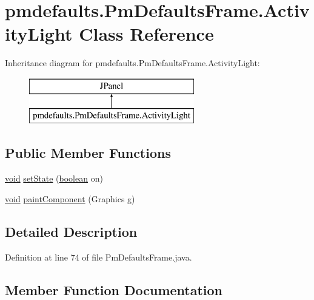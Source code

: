 \hypertarget{classpmdefaults_1_1_pm_defaults_frame_1_1_activity_light}{}\section{pmdefaults.\+Pm\+Defaults\+Frame.\+Activity\+Light Class Reference}
\label{classpmdefaults_1_1_pm_defaults_frame_1_1_activity_light}
Inheritance diagram for pmdefaults.\+Pm\+Defaults\+Frame.\+Activity\+Light\+:\begin{figure}[H]
\begin{center}
\leavevmode
\includegraphics[height=2.000000cm]{classpmdefaults_1_1_pm_defaults_frame_1_1_activity_light}
\end{center}
\end{figure}
\subsection*{Public Member Functions}
\begin{DoxyCompactItemize}
\item 
\hyperlink{sound_8c_ae35f5844602719cf66324f4de2a658b3}{void} \hyperlink{classpmdefaults_1_1_pm_defaults_frame_1_1_activity_light_a93ca92f9f9d0b6f79f95c4293e5fb740}{set\+State} (\hyperlink{cext_8h_a7670a4e8a07d9ebb00411948b0bbf86d}{boolean} on)
\item 
\hyperlink{sound_8c_ae35f5844602719cf66324f4de2a658b3}{void} \hyperlink{classpmdefaults_1_1_pm_defaults_frame_1_1_activity_light_a3e020a20b2fa8e6c32b4e82403ab9878}{paint\+Component} (Graphics g)
\end{DoxyCompactItemize}


\subsection{Detailed Description}


Definition at line 74 of file Pm\+Defaults\+Frame.\+java.



\subsection{Member Function Documentation}
